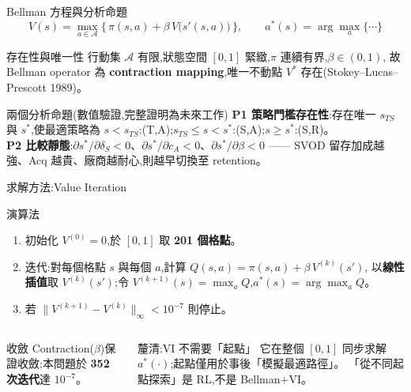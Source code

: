 \documentclass[aspectratio=169,11pt,fontset=none]{ctexbeamer}
\newcommand{\hl}[1]{{\color{rblue}\bfseries #1}}
\begin{document}
\begin{frame}{Bellman 方程與分析命題}
  \[
    V(s)=\max_{a\in\mathcal{A}}\Big\{\,\pi(s,a)+\beta\,V\big(s'(s,a)\big)\,\Big\},
    \qquad a^{*}(s)=\arg\max_{a}\{\cdots\}
  \]
  \begin{block}{存在性與唯一性}
    \footnotesize
    行動集 $\mathcal{A}$ 有限,狀態空間 $[0,1]$ 緊緻,$\pi$ 連續有界,$\beta\in(0,1)$,
    故 Bellman operator 為 \hl{contraction mapping},唯一不動點 $V^{*}$ 存在(Stokey--Lucas--Prescott 1989)。
  \end{block}
  \begin{exampleblock}{兩個分析命題(數值驗證,完整證明為未來工作)}
    \footnotesize
    \textbf{P1 策略門檻存在性}:存在唯一 $s_{TS}$ 與 $s^{*}$,使最適策略為
    $s<s_{TS}$:(T,A);$s_{TS}\le s<s^{*}$:(S,A);$s\ge s^{*}$:(S,R)。\\[0.2em]
    \textbf{P2 比較靜態}:$\partial s^{*}/\partial\delta_S<0$、$\partial s^{*}/\partial c_A<0$、$\partial s^{*}/\partial\beta<0$
    —— SVOD 留存加成越強、Acq 越貴、廠商越耐心,則越早切換至 retention。
  \end{exampleblock}
\end{frame}

\begin{frame}{求解方法:Value Iteration}
  \begin{block}{演算法}
    \footnotesize
    \begin{enumerate}\itemsep2pt
      \item 初始化 $V^{(0)}=0$,於 $[0,1]$ 取 \textbf{201 個格點}。
      \item 迭代:對每個格點 $s$ 與每個 $a$,計算 $Q(s,a)=\pi(s,a)+\beta\,V^{(k)}(s')$,
            以\textbf{線性插值}取 $V^{(k)}(s')$;令 $V^{(k+1)}(s)=\max_a Q$,$a^{*}(s)=\arg\max_a Q$。
      \item 若 $\lVert V^{(k+1)}-V^{(k)}\rVert_\infty<10^{-7}$ 則停止。
    \end{enumerate}
  \end{block}
  \begin{columns}[t]
      \begin{exampleblock}{收斂}
        \footnotesize Contraction($\beta$)保證收斂;本問題於 \hl{352 次迭代}達 $10^{-7}$。
      \end{exampleblock}
      \begin{alertblock}{釐清:VI 不需要「起點」}
        \footnotesize 它在整個 $[0,1]$ 同步求解 $a^{*}(\cdot)$;起點僅用於事後「模擬最適路徑」。
        「從不同起點探索」是 RL,不是 Bellman+VI。
      \end{alertblock}
  \end{columns}
\end{frame}
\end{document}
